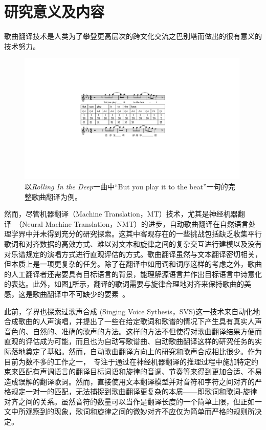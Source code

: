 \section{研究意义及内容}
歌曲翻译技术是人类为了攀登更高层次的跨文化交流之巴别塔而做出的很有意义的技术努力。
\begin{figure}[htbp]
  \includegraphics[width=0.99\textwidth]{figure/ast/exp.pdf}
  \caption{以\textit{Rolling In the Deep}一曲中``But you play it to the beat''一句的完整歌曲翻译为例。}
  \label{fig:task_exp}
\end{figure}
然而，尽管机器翻译（Machine Translation，MT）技术，尤其是神经机器翻译~\citep{nmt,vaswani2017attention,hassan2018achieving}（Neural Machine Translation，NMT）的进步，自动歌曲翻译在自然语言处理学界中并未得到充分的研究探索。这其中客观存在的一些挑战包括缺乏收集平行歌词和对齐数据的高效方式、难以对文本和旋律之间的复杂交互进行建模以及没有对乐谱规定的演唱方式进行直观评估的方式。歌曲翻译虽然与文本翻译密切相关，但本质上是一项更复杂的任务。除了在翻译中如用词和词序这样的考虑之外，歌曲的人工翻译者还需要具有目标语言的背景，能理解源语言并作出目标语言中诗意化的表达。此外，如图\ref{fig:task_exp}所示，翻译的歌词需要与旋律合理地对齐来保持歌曲的美感，这是歌曲翻译中不可缺少的要素~\citep{three_d_of_singability}。

此前，学界也探索过歌声合成 (Singing Voice Sythesis，SVS)这一技术来自动化地合成歌曲的人声演唱，并提出了一些在给定歌词和歌谱的情况下产生具有真实人声音色的、自然的、准确的歌声的方法。这样的方法不但使得对歌曲翻译结果方便而直观的评估成为可能，而且也为自动写歌谱曲、自动歌曲翻译这样的研究任务的实际落地奠定了基础。然而，自动歌曲翻译方向上的研究和歌声合成相比很少。作为目前为数不多的工作之一，~\citet{gagast}专注于通过在神经机器翻译的推理过程中施加特定约束来匹配有声调语言的翻译目标词语和旋律的音调、节奏等来得到更加合适、不易造成误解的翻译歌词。然而，\citet{gagast}直接使用文本翻译模型并对音符和字符之间对齐的严格规定一对一的匹配，无法捕捉到歌曲翻译更复杂的本质——即歌词和歌词-旋律对齐之间的关系。虽然音符的数量可以当作是翻译长度的一个简单上限，但正如\citet{interplay_lyrics_melody}一文中所观察到的现象，歌词和旋律之间的微妙对齐不应仅为简单而严格的规则所决定。


